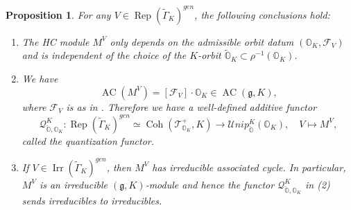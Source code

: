 \documentclass[11pt, a4paper]{amsart}
\newcommand{\g}{\mathfrak{g}}
\newcommand{\orb}{\mathbb{O}}
\newcommand{\orbk}{\orb_{K}}
\newcommand{\torbk}{\widetilde{\orb}_{K}}
\newcommand{\ckorb}{\check{\orb}}
\newcommand{\cF}{\mathcal{F}}
\newcommand{\MV}{M^{\scriptscriptstyle V}}
\newcommand{\tGamma}{\widetilde{\Gamma}}
\DeclareMathOperator{\AC}{AC}
\DeclareMathOperator{\Rep}{Rep}
\DeclareMathOperator{\Coh}{Coh}
\newcommand{\cUnipOv}{\mathcal{U}nip_{\ckorb}}
\newcommand{\TT}{\mathscr{T}}
\newcommand{\quan}{\mathcal{Q}}
\newcommand{\Irr}{\operatorname{Irr}}
\newtheorem{Prop}[Thm]{Proposition}
\theoremstyle{definition}
\numberwithin{equation}{section}
\begin{document}
\begin{Prop} \label{prop:MV_AC}
For any $V \in \Rep(\tGamma_K)^{gen}$, the following conclusions hold:
\begin{enumerate}
	\item 
		The HC module $\MV$ only depends on the admissible orbit datum $(\orbk, \cF_V)$ and is independent of the choice of the $K$-orbit $\torbk \subset \rho^{-1}(\orbk)$. 
	\item 
		We have
		\begin{equation}
			\AC(\MV) = [\cF_V] \cdot \orbk \in \AC(\g,K),
		\end{equation}
		where $\cF_V$ is as in . Therefore we have a well-defined additive functor 
		\[ \quan_{\ckorb, \orbk}^K: \Rep(\tGamma_K)^{gen} \simeq \Coh(\TT^+_{\orbk}, K) \to \cUnipOv^K(\orbk), \quad V \mapsto \MV, \]
		called the \emph{quantization functor}.
	\item
		If $V \in \Irr(\tGamma_K)^{gen}$, then $\MV$ has irreducible associated cycle. In particular, $\MV$ is an irreducible $(\g,K)$-module and hence the functor $\quan_{\ckorb, \orbk}^K$ in (2) sends irreducibles to irreducibles.
	\end{enumerate}
\end{Prop}
\end{document}
